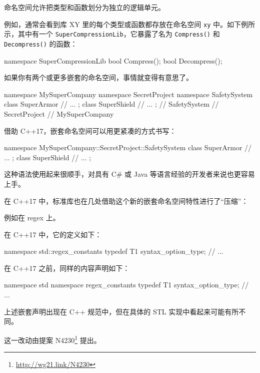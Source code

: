 命名空间允许把类型和函数划分为独立的逻辑单元。

例如，通常会看到库 XY 里的每个类型或函数都存放在命名空间 \texttt{xy} 中。如下例所示，其中有一个 \texttt{SuperCompressionLib}，它暴露了名为 \texttt{Compress()} 和 \texttt{Decompress()} 的函数：

\begin{codebox}[cpp]
namespace SuperCompressionLib {
bool Compress();
bool Decompress();
}
\end{codebox}

如果你有两个或更多嵌套的命名空间，事情就变得有意思了。

\begin{codebox}[cpp]
namespace MySuperCompany {
namespace SecretProject {
namespace SafetySystem {
class SuperArmor {
// ...
};
class SuperShield {
// ...
};
} // SafetySystem
} // SecretProject
} // MySuperCompany
\end{codebox}

借助 C++17，嵌套命名空间可以用更紧凑的方式书写：

\begin{codebox}[cpp]
namespace MySuperCompany::SecretProject::SafetySystem {
class SuperArmor {
// ...
};
class SuperShield {
// ...
};
}
\end{codebox}

这种语法使用起来很顺手，对具有 C\# 或 Java 等语言经验的开发者来说也更容易上手。

在 C++17 中，标准库也在几处借助这个新的嵌套命名空间特性进行了“压缩”：

例如在 regex 上。

在 C++17 中，它的定义如下：

\begin{codebox}[cpp]
namespace std::regex_constants {
typedef T1 syntax_option_type;
// ...
}
\end{codebox}

在 C++17 之前，同样的内容声明如下：

\begin{codebox}[cpp]
namespace std {
namespace regex_constants {
typedef T1 syntax_option_type;
// ...
}
}
\end{codebox}

上述嵌套声明出现在 C++ 规范中，但在具体的 STL 实现中看起来可能有所不同。

\begin{myInfoBox}
这一改动由提案 N4230\footnote{\url{http://wg21.link/N4230}} 提出。
\end{myInfoBox}

